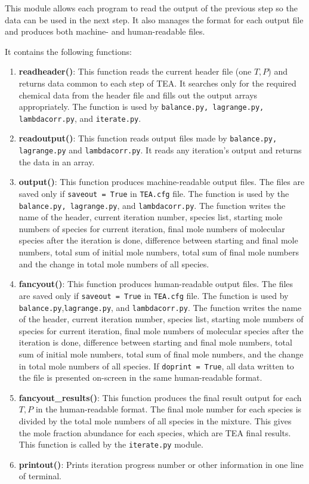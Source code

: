 This module allows each program to read the output of the previous
step so the data can be used in the next step. It also manages the
format for each output file and produces both machine- and
human-readable files.

It contains the following functions: 
{
\begin{enumerate}
\setlength\itemsep{0ex}
\setlength\topsep{0ex}
\setlength\partopsep{0ex}
\setlength\parsep{0ex}
   \item {\bf readheader()}: This function reads the current header
   file (one $T, P$) and returns data common to each step of TEA. It
   searches only for the required chemical data from the header file
   and fills out the output arrays appropriately. The function is used
   by \texttt{balance.py, lagrange.py, lambdacorr.py},
   and \texttt{iterate.py}.  \item {\bf readoutput()}: This function
   reads output files made by \texttt{balance.py, \newline
   lagrange.py} and \texttt{lambdacorr.py}. It reads any iteration's
   output and returns the data in an array.  \item {\bf output()}:
   This function produces machine-readable output files. The files are
   saved only if \texttt{saveout = True} in \texttt{TEA.cfg} file. The
   function is used by the \texttt{balance.py, lagrange.py},
   and \texttt{lambdacorr.py}. The function writes the name of the
   header, current iteration number, species list, starting mole
   numbers of species for current iteration, final mole numbers of
   molecular species after the iteration is done, difference between
   starting and final mole numbers, total sum of initial mole numbers,
   total sum of final mole numbers and the change in total mole
   numbers of all species.  \item {\bf fancyout()}: This function
   produces human-readable output files. The files are saved only
   if \texttt{saveout = True} in \texttt{TEA.cfg} file. The function
   is used by \texttt{balance.py},\newline \texttt{lagrange.py},
   and \texttt{lambdacorr.py}. The function writes the name of the
   header, current iteration number, species list, starting mole
   numbers of species for current iteration, final mole numbers of
   molecular species after the iteration is done, difference between
   starting and final mole numbers, total sum of initial mole numbers,
   total sum of final mole numbers, and the change in total mole
   numbers of all species.  If \texttt{doprint = True}, all data
   written to the file is presented on-screen in the same
   human-readable format.  \item {\bf fancyout\_results()}: This
   function produces the final result output for each $T, P$ in the
   human-readable format. The final mole number for each species is
   divided by the total mole numbers of all species in the
   mixture. This gives the mole fraction abundance for each species,
   which are TEA final results. This function is called by
   the \texttt{iterate.py} module.  \item {\bf printout()}: Prints
   iteration progress number or other information in one line of
   terminal.
\end{enumerate}
}


